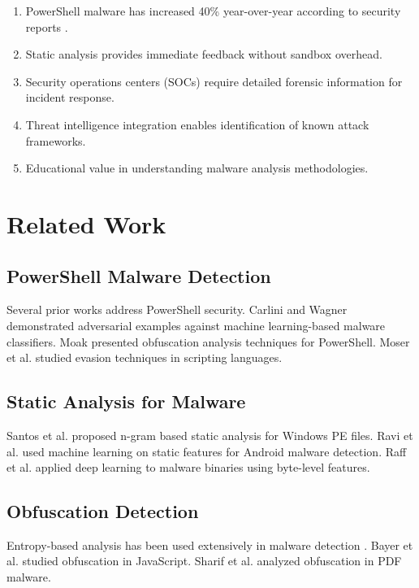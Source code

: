\documentclass[10pt,conference,a4paper]{IEEEtran}
\begin{document}
\begin{enumerate}
\item PowerShell malware has increased 40\% year-over-year according to security reports \cite{ref4}.
\item Static analysis provides immediate feedback without sandbox overhead.
\item Security operations centers (SOCs) require detailed forensic information for incident response.
\item Threat intelligence integration enables identification of known attack frameworks.
\item Educational value in understanding malware analysis methodologies.
\end{enumerate}

\section{Related Work}

\subsection{PowerShell Malware Detection}

Several prior works address PowerShell security. Carlini and Wagner \cite{ref5} demonstrated adversarial examples against machine learning-based malware classifiers. Moak \cite{ref6} presented obfuscation analysis techniques for PowerShell. Moser et al. \cite{ref7} studied evasion techniques in scripting languages.

\subsection{Static Analysis for Malware}

Santos et al. \cite{ref8} proposed n-gram based static analysis for Windows PE files. Ravi et al. \cite{ref9} used machine learning on static features for Android malware detection. Raff et al. \cite{ref10} applied deep learning to malware binaries using byte-level features.

\subsection{Obfuscation Detection}

Entropy-based analysis has been used extensively in malware detection \cite{ref11, ref12}. Bayer et al. \cite{ref13} studied obfuscation in JavaScript. Sharif et al. \cite{ref14} analyzed obfuscation in PDF malware.
\end{document}
